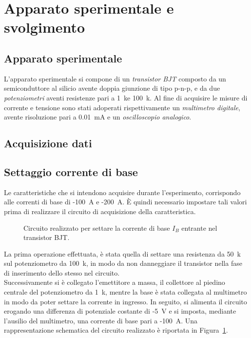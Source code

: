 \documentclass[../main.tex]{subfiles}
\begin{document}
    \section{Apparato sperimentale e svolgimento} \label{sec:acquisizione}

    \subsection{Apparato sperimentale}\label{subsec:apparato-sperimentale}

    L'apparato sperimentale si compone di un \textit{transistor BJT} composto da un
    semiconduttore al silicio avente doppia giunzione di tipo p-n-p, e da due
    \textit{potenziometri} aventi resistenze pari a 1~k\textohm\;e 100~k\textohm.
    Al fine di acquisire le misure di corrente e tensione sono stati adoperati
    rispettivamente un \textit{multimetro digitale}, avente risoluzione pari a
    0.01~mA e un \textit{oscilloscopio analogico}.

    \subsection{Acquisizione dati}\label{subsec:acquisizione-dati}
    \vspace{0.2cm}
    \subsection*{Settaggio corrente di base}

    Le caratteristiche che si intendono acquisire durante l'esperimento,
    corrispondo alle correnti di base di -100~\textmu A e -200~\textmu A.
    È quindi necessario impostare tali valori prima di realizzare il circuito
    di acquisizione della caratteristica.

    \begin{figure}[h!]
        \centering
        
        \caption{Circuito realizzato per settare la corrente di base $I_B$ entrante nel transistor BJT.}
        \label{fig:circuito-corrente-base}
    \end{figure}

    \noindent La prima operazione effettuata, è stata quella di settare
    una resistenza da 50~k\textohm\; sul potenziometro da 100~k\textohm,
    in modo da non danneggiare il transistor nella fase di inserimento dello stesso nel circuito. \\
    Successivamente si è collegato l'emettitore a massa, il collettore al piedino centrale
    del potenziometro da 1~k\textohm, mentre la base è stata collegata al multimetro
    in modo da poter settare la corrente in ingresso.
    In seguito, si alimenta il circuito erogando una differenza di potenziale
    costante di -5~V e si imposta, mediante l'ausilio del multimetro,
    una corrente di base pari a -100~\textmu A.
    Una rappresentazione schematica del circuito realizzato è riportata
    in Figura~\ref{fig:circuito-corrente-base}.
\end{document}
